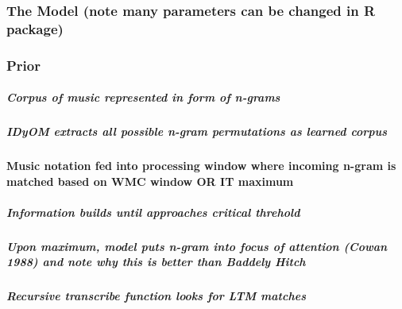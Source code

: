 \documentclass[]{book}
\let\oldparagraph\paragraph
\renewcommand{\paragraph}[1]{\oldparagraph{#1}\mbox{}}
\let\oldsubparagraph\subparagraph
\renewcommand{\subparagraph}[1]{\oldsubparagraph{#1}\mbox{}}
\theoremstyle{definition}
\theoremstyle{definition}
\theoremstyle{definition}
\theoremstyle{remark}
\begin{document}
\hypertarget{the-model-note-many-parameters-can-be-changed-in-r-package}{%
\subsubsection{The Model (note many parameters can be changed in R
package)}\label{the-model-note-many-parameters-can-be-changed-in-r-package}}

\hypertarget{prior}{%
\subsubsection{Prior}\label{prior}}

\hypertarget{corpus-of-music-represented-in-form-of-n-grams}{%
\subparagraph{Corpus of music represented in form of
n-grams}\label{corpus-of-music-represented-in-form-of-n-grams}}

\hypertarget{idyom-extracts-all-possible-n-gram-permutations-as-learned-corpus}{%
\subparagraph{IDyOM extracts all possible n-gram permutations as learned
corpus}\label{idyom-extracts-all-possible-n-gram-permutations-as-learned-corpus}}

\hypertarget{music-notation-fed-into-processing-window-where-incoming-n-gram-is-matched-based-on-wmc-window-or-it-maximum}{%
\paragraph{Music notation fed into processing window where incoming
n-gram is matched based on WMC window OR IT
maximum}\label{music-notation-fed-into-processing-window-where-incoming-n-gram-is-matched-based-on-wmc-window-or-it-maximum}}

\hypertarget{information-builds-until-approaches-critical-threhold}{%
\subparagraph{Information builds until approaches critical
threhold}\label{information-builds-until-approaches-critical-threhold}}

\hypertarget{upon-maximum-model-puts-n-gram-into-focus-of-attention-cowan-1988-and-note-why-this-is-better-than-baddely-hitch}{%
\subparagraph{Upon maximum, model puts n-gram into focus of attention
(Cowan 1988) and note why this is better than Baddely
Hitch}\label{upon-maximum-model-puts-n-gram-into-focus-of-attention-cowan-1988-and-note-why-this-is-better-than-baddely-hitch}}

\hypertarget{recursive-transcribe-function-looks-for-ltm-matches}{%
\subparagraph{Recursive transcribe function looks for LTM
matches}\label{recursive-transcribe-function-looks-for-ltm-matches}}
\end{document}
